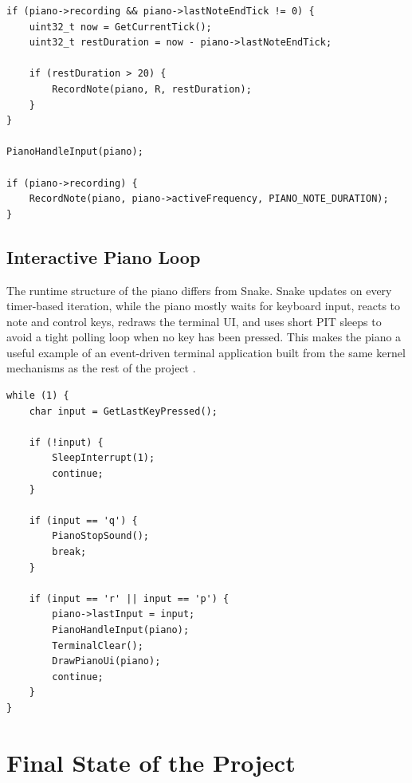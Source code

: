 \begin{listing}[H]
\begin{verbatim}
if (piano->recording && piano->lastNoteEndTick != 0) {
    uint32_t now = GetCurrentTick();
    uint32_t restDuration = now - piano->lastNoteEndTick;

    if (restDuration > 20) {
        RecordNote(piano, R, restDuration);
    }
}

PianoHandleInput(piano);

if (piano->recording) {
    RecordNote(piano, piano->activeFrequency, PIANO_NOTE_DURATION);
}
\end{verbatim}
\caption{The piano stores both played notes and longer gaps so recorded songs preserve rhythm.}
\end{listing}
\clearpage

\subsection{Interactive Piano Loop}
The runtime structure of the piano differs from Snake. Snake updates on every timer-based iteration, while the piano mostly waits for keyboard input, reacts to note and control keys, redraws the terminal UI, and uses short PIT sleeps to avoid a tight polling loop when no key has been pressed. This makes the piano a useful example of an event-driven terminal application built from the same kernel mechanisms as the rest of the project \cite{osdevPs2Controller,osdevPit}.

\begin{listing}[H]
\begin{verbatim}
while (1) {
    char input = GetLastKeyPressed();

    if (!input) {
        SleepInterrupt(1);
        continue;
    }

    if (input == 'q') {
        PianoStopSound();
        break;
    }

    if (input == 'r' || input == 'p') {
        piano->lastInput = input;
        PianoHandleInput(piano);
        TerminalClear();
        DrawPianoUi(piano);
        continue;
    }
}
\end{verbatim}
\caption{The piano loop combines keyboard polling, terminal redraws, and PIT-backed waiting.}
\end{listing}
\clearpage

\section{Final State of the Project}


